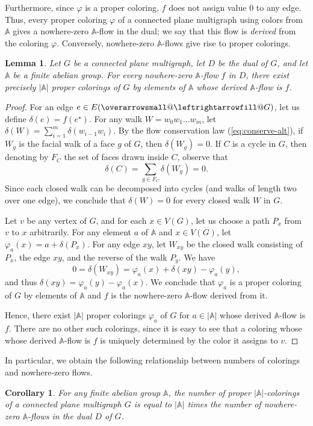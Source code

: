 \documentclass[12pt,twoside,openright,a4paper]{book}
\makeatletter
\newtheorem{lemma}[theorem]{Lemma}
\newtheorem{corollary}[theorem]{Corollary}
\newcommand{\ovlr}{\mathpalette{\overarrowsmall@\leftrightarrowfill@}}
\newcommand{\overarrowsmall@}[3]{%
  \vbox{%
    \ialign{%
      ##\crcr
      #1{\smaller@style{#2}}\crcr
      \noalign{\nointerlineskip}%
      $\m@th\hfil#2#3\hfil$\crcr
    }%
  }%
}
\def\smaller@style#1{%
  \ifx#1\displaystyle\scriptstyle\else
    \ifx#1\textstyle\scriptstyle\else
      \scriptscriptstyle
    \fi
  \fi
}
\makeatother
\begin{document}
Furthermore, since $\varphi$ is a proper coloring, $f$ does not assign value $0$ to any edge.  Thus, every proper coloring $\varphi$
of a connected plane multigraph using colors from $\mathbb{A}$ gives a nowhere-zero $\mathbb{A}$-flow in the dual;
we say that this flow is \emph{derived} from the coloring $\varphi$.  Conversely, nowhere-zero $\mathbb{A}$-flows give rise
to proper colorings.
\begin{lemma}\label{lemma:flowtocolor}
Let $G$ be a connected plane multigraph, let $D$ be the dual of $G$, and let $\mathbb{A}$ be a finite abelian group.
For every nowhere-zero $\mathbb{A}$-flow $f$ in $D$, there exist precisely $|\mathbb{A}|$ proper colorings of $G$
by elements of $\mathbb{A}$ whose derived $\mathbb{A}$-flow is $f$.
\end{lemma}
\begin{proof}
For an edge $e\in E(\ovlr{G})$, let us define $\delta(e)=f(e^\star)$.  For any walk $W=w_0w_1\ldots w_m$, let $\delta(W)=\sum_{i=1}^m \delta(w_{i-1}w_i)$.
By the flow conservation law (\ref{eq:conserve-alt}), if $W_g$ is the facial walk of a face $g$ of $G$, then $\delta(W_g)=0$.
If $C$ is a cycle in $G$, then denoting by $F_C$ the set of faces drawn inside $C$,
observe that
$$\delta(C)=\sum_{g\in F_C} \delta(W_g)=0.$$
Since each closed walk can be decomposed into cycles (and walks of length two over one edge), we conclude
that $\delta(W)=0$ for every closed walk $W$ in $G$.

Let $v$ be any vertex of $G$, and for each $x\in V(G)$, let us choose a path $P_x$ from $v$ to $x$ arbitrarily.
For any element $a$ of $\mathbb{A}$ and $x\in V(G)$, let $\varphi_a(x)=a+\delta(P_x)$.
For any edge $xy$, let $W_{xy}$ be the closed walk consisting of $P_x$, the edge $xy$, and the reverse of the walk $P_y$.
We have
$$0=\delta(W_{xy})=\varphi_a(x)+\delta(xy)-\varphi_a(y),$$
and thus $\delta(xy)=\varphi_a(y)-\varphi_a(x)$.  We conclude that $\varphi_a$ is a proper coloring of $G$ by elements
of $\mathbb{A}$ and $f$ is the nowhere-zero $\mathbb{A}$-flow derived from it.

Hence, there exist $|\mathbb{A}|$ proper colorings $\varphi_a$ of $G$ for $a\in |\mathbb{A}|$ whose derived $\mathbb{A}$-flow is $f$.
There are no other such colorings, since it is easy to see that a coloring whose whose derived $\mathbb{A}$-flow is $f$
is uniquely determined by the color it assigns to $v$.
\end{proof}

In particular, we obtain the following relationship between numbers of colorings and nowhere-zero flows.
\begin{corollary}\label{cor:numflowcol}
For any finite abelian group $\mathbb{A}$,
the number of proper $|\mathbb{A}|$-colorings of a connected plane multigraph $G$ is equal to $|\mathbb{A}|$ times the number
of nowhere-zero $\mathbb{A}$-flows in the dual $D$ of $G$.
\end{corollary}
\end{document}
